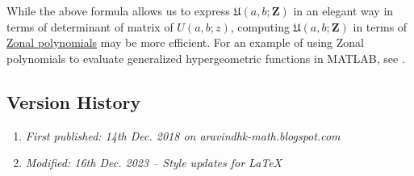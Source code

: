 While the above formula allows us to express $\mathfrak{U}(a,b;\boldsymbol{Z})$ in an elegant way in terms of determinant of matrix of $U(a,b;z)$, computing $\mathfrak{U}(a,b;\boldsymbol{Z})$ in terms of \href{https://en.wikipedia.org/wiki/Zonal_polynomial}{Zonal polynomials} may be more efficient. For an example of using Zonal polynomials to evaluate generalized hypergeometric functions in MATLAB, see \cite{Koev2018}. 

\subsection{Version History}
\begin{enumerate}
	\item \emph{First published: 14th Dec. 2018 on aravindhk-math.blogspot.com}
	\item \emph{Modified: 16th Dec. 2023 -- Style updates for \LaTeX}
\end{enumerate}

